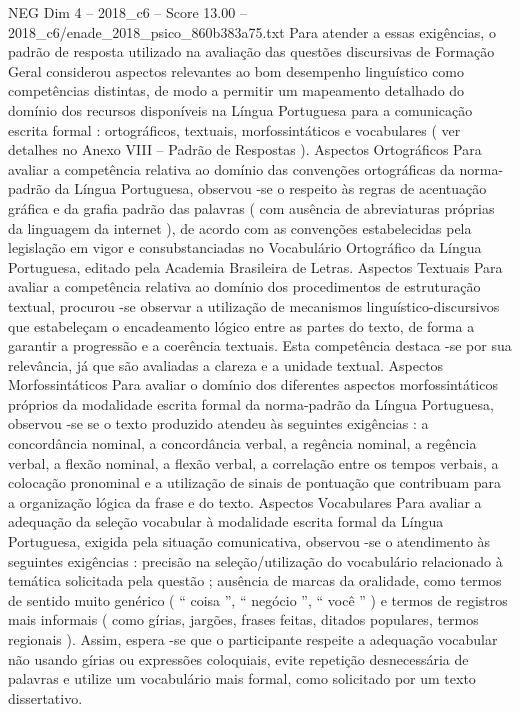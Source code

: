 \begin{textsample}{NEG Dim 4 – 2018\_c6 – Score 13.00 – 2018\_c6/enade\_2018\_psico\_860b383a75.txt}
Para atender a essas exigências, o padrão de resposta utilizado na avaliação das questões discursivas de Formação Geral considerou aspectos relevantes ao bom desempenho linguístico como competências distintas, de modo a permitir um mapeamento detalhado do domínio dos recursos disponíveis na Língua Portuguesa para a comunicação escrita formal : ortográficos, textuais, morfossintáticos e vocabulares ( ver detalhes no Anexo VIII – Padrão de Respostas ).
Aspectos Ortográficos Para avaliar a competência relativa ao domínio das convenções ortográficas da norma-padrão da Língua Portuguesa, observou -se o respeito às regras de acentuação gráfica e da grafia padrão das palavras ( com ausência de abreviaturas próprias da linguagem da internet ), de acordo com as convenções estabelecidas pela legislação em vigor e consubstanciadas no Vocabulário Ortográfico da Língua Portuguesa, editado pela Academia Brasileira de Letras.
Aspectos Textuais Para avaliar a competência relativa ao domínio dos procedimentos de estruturação textual, procurou -se observar a utilização de mecanismos linguístico-discursivos que estabeleçam o encadeamento lógico entre as partes do texto, de forma a garantir a progressão e a coerência textuais.
Esta competência destaca -se por sua relevância, já que são avaliadas a clareza e a unidade textual.
Aspectos Morfossintáticos Para avaliar o domínio dos diferentes aspectos morfossintáticos próprios da modalidade escrita formal da norma-padrão da Língua Portuguesa, observou -se se o texto produzido atendeu às seguintes exigências : a concordância nominal, a concordância verbal, a regência nominal, a regência verbal, a flexão nominal, a flexão verbal, a correlação entre os tempos verbais, a colocação pronominal e a utilização de sinais de pontuação que contribuam para a organização lógica da frase e do texto.
Aspectos Vocabulares Para avaliar a adequação da seleção vocabular à modalidade escrita formal da Língua Portuguesa, exigida pela situação comunicativa, observou -se o atendimento às seguintes exigências : precisão na seleção/utilização do vocabulário relacionado à temática solicitada pela questão ; ausência de marcas da oralidade, como termos de sentido muito genérico ( “ coisa ”, “ negócio ”, “ você ” ) e termos de registros mais informais ( como gírias, jargões, frases feitas, ditados populares, termos regionais ).
Assim, espera -se que o participante respeite a adequação vocabular não usando gírias ou expressões coloquiais, evite repetição desnecessária de palavras e utilize um vocabulário mais formal, como solicitado por um texto dissertativo.

\end{textsample}
